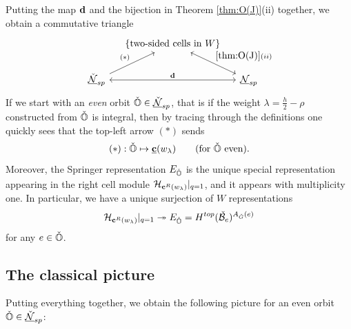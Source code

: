 \documentclass[reqno]{amsart}
\newcommand{\ubar}[1]{\underline{#1}}
\begin{document}
Putting the map $\mathbf{d}$ and the bijection in Theorem \ref{thm:O(J)}(ii) together, we obtain a commutative triangle
\begin{equation}\label{diag:fin-tri}
	\begin{tikzcd}[column sep=small]
		& \{\text{two-sided cells in }W\} \ar[dr, leftrightarrow, "{\ref{thm:O(J)}(ii)}"] \\
		\ubar{\check \cN}_{sp} \ar[rr, leftrightarrow, "\bd"] \ar[ur, "(\ast)"]
		&& \ubar \cN_{sp}
	\end{tikzcd}
\end{equation}
If we start with an \textit{even} orbit $\check \BO \in \ubar{\check \cN}_{sp}$, that is if the weight $\lambda = \frac h2 - \rho$ constructed from $\check {\mathbb{O}}$ is integral, then by tracing through the definitions one quickly sees that the top-left arrow $(\ast)$ sends 
\begin{equation}\label{eqn:even-to-cell}
	(\ast): \check \BO \mapsto \ubar \bc(w_\lambda) \qquad (\text{for } \check \BO \text{ even}).
\end{equation}
Moreover, the Springer representation $E_{\check{\mathbb{O}}}$ is the unique special representation appearing in the right cell module $\mathcal{H}_{\mathbf{c}^R(w_\lambda)}|_{q=1}$, and it appears with multiplicity one. In particular, we have a unique surjection of $W$ representations 
\begin{equation}\label{eqn:cR-to-Spr}
	\mathcal{H}_{\mathbf{c}^R(w_\lambda)}|_{q=1} \twoheadrightarrow E_{\check {\mathbb{O}}} = H^{top}(\check {\mathcal{B}}_e)^{A_{\check G}(e)}	
\end{equation}
for any $e \in \check {\mathbb{O}}$.

\subsection{The classical picture}\label{subsec:classical-dual}

Putting everything together, we obtain the following picture for an even orbit $\check \BO \in \ubar{\check \cN}_{sp}$:
\end{document}
